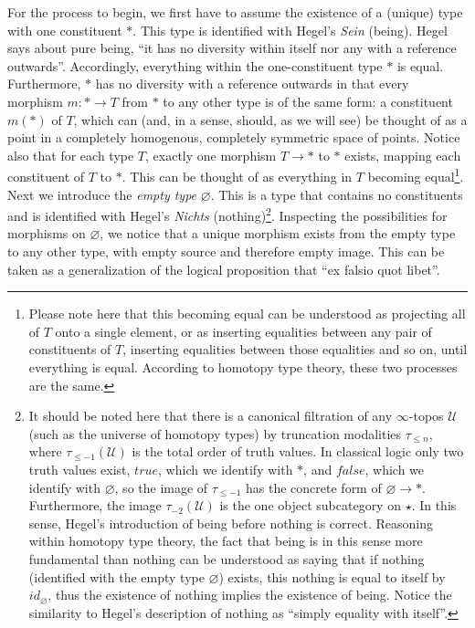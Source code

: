 \documentclass{article}
\begin{document}
For the process to begin, we first have to assume the existence of a (unique) type with one constituent
$*$. This type is identified with Hegel's \emph{Sein} (being). Hegel says about pure being, ``it has no
diversity within itself nor any with a reference outwards''. Accordingly, everything within the one-constituent
type $*$ is equal. Furthermore, $*$ has no diversity with a reference outwards in that every morphism
$m:*\rightarrow T$ from $*$ to any other type is of the same form: a constituent $m(*)$ of $T$, which
can (and, in a sense, should, as we will see) be thought of as a point in a completely homogenous, completely
symmetric space of points. Notice also that for each type $T$, exactly one morphism $T\rightarrow *$ to
$*$ exists, mapping each constituent of $T$ to $*$. This can be thought of as everything in $T$ becoming
equal\footnote{Please note here that this becoming equal can be understood as projecting all of $T$ onto
a single element, or as inserting equalities between any pair of constituents of $T$, inserting equalities
between those equalities and so on, until everything is equal. According to homotopy type theory, these
two processes are the same.}. \\ 

Next we introduce the \emph{empty type} $\varnothing$. This is a type that contains no constituents and
is identified with Hegel's \emph{Nichts} (nothing)\footnote{It should be noted here that there is a canonical
filtration of any $\infty$-topos $\mathcal{U}$ (such as the universe of homotopy types) by truncation
modalities $\tau_{\leq n}$, where $\tau_{\leq -1}(\mathcal{U})$ is the total order of truth values. In
classical logic only two truth values exist, $true$, which we identify with $*$, and $false$, which we
identify with $\varnothing$, so the image of $\tau_{\leq -1}$ has the concrete form of $\varnothing\rightarrow
*$. Furthermore, the image $\tau_{-2}(\mathcal{U})$ is the one object subcategory on $\star$. In this
sense, Hegel's introduction of being before nothing is correct. Reasoning within homotopy type theory,
the fact that being is in this sense more fundamental than nothing can be understood as saying that if
nothing (identified with the empty type $\varnothing$) exists, this nothing is equal to itself by $id_\varnothing$,
thus the existence of nothing implies the existence of being. Notice the similarity to Hegel's description
of nothing as ``simply equality with itself''.}. Inspecting the possibilities for morphisms on $\varnothing$,
we notice that a unique morphism exists from the empty type to any other type, with empty source and therefore
empty image. This can be taken as a generalization of the logical proposition that ``ex falsio quot libet''.
\\
\end{document}
